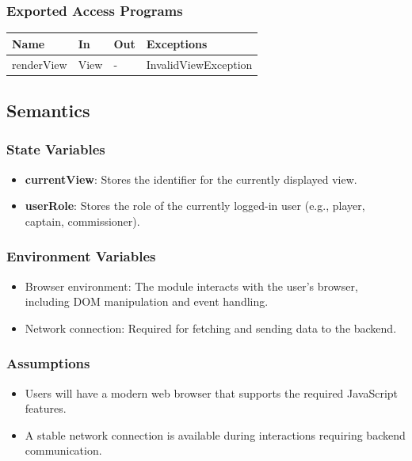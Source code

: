 \documentclass[12pt, titlepage]{article}
\begin{document}
\subsubsection{Exported Access Programs}

\begin{center}
  \begin{tabularx}{\textwidth}{|l|X|X|X|}
    \hline
    \textbf{Name} & \textbf{In} & \textbf{Out} & \textbf{Exceptions}  \\
    \hline
    renderView    & View        & -            & InvalidViewException \\
    \hline
  \end{tabularx}
\end{center}

\subsection{Semantics}

\subsubsection{State Variables}

\begin{itemize}
  \item \textbf{currentView}: Stores the identifier for the currently displayed view.
  \item \textbf{userRole}: Stores the role of the currently logged-in user (e.g., player, captain, commissioner).
\end{itemize}

\subsubsection{Environment Variables}

\begin{itemize}
  \item Browser environment: The module interacts with the user's browser, including DOM manipulation and event handling.
  \item Network connection: Required for fetching and sending data to the backend.
\end{itemize}

\subsubsection{Assumptions}

\begin{itemize}
  \item Users will have a modern web browser that supports the required JavaScript features.
  \item A stable network connection is available during interactions requiring backend communication.
\end{itemize}
\end{document}
